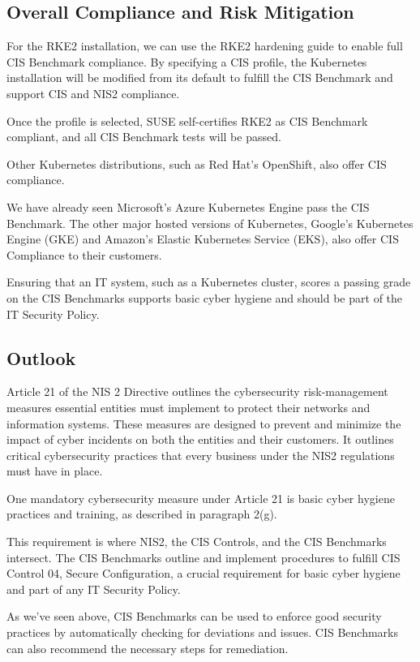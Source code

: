 \subsection{Overall Compliance and Risk Mitigation}

For the RKE2 installation, we can use the RKE2 hardening guide to enable full CIS Benchmark compliance. By specifying a CIS profile, the Kubernetes installation will be modified from its default to fulfill the CIS Benchmark and support CIS and NIS2 compliance.

Once the profile is selected, SUSE self-certifies RKE2 as CIS Benchmark compliant, and all CIS Benchmark tests will be passed.

Other Kubernetes distributions, such as Red Hat's OpenShift, also offer CIS compliance. 

We have already seen Microsoft's Azure Kubernetes Engine pass the CIS Benchmark. The other major hosted versions of Kubernetes, Google's Kubernetes Engine (GKE) and Amazon's Elastic Kubernetes Service (EKS), also offer CIS Compliance to their customers.

Ensuring that an IT system, such as a Kubernetes cluster, scores a passing grade on the CIS Benchmarks supports basic cyber hygiene and should be part of the IT Security Policy.

\subsection{Outlook}

Article 21 of the NIS 2 Directive outlines the cybersecurity risk-management measures essential entities must implement to protect their networks and information systems. These measures are designed to prevent and minimize the impact of cyber incidents on both the entities and their customers. It outlines critical cybersecurity practices that every business under the NIS2 regulations must have in place. 

One mandatory cybersecurity measure under Article 21 is basic cyber hygiene practices and training, as described in paragraph 2(g).

This requirement is where NIS2, the CIS Controls, and the CIS Benchmarks intersect. The CIS Benchmarks outline and implement procedures to fulfill CIS Control 04, Secure Configuration, a crucial requirement for basic cyber hygiene and part of any IT Security Policy.

As we've seen above, CIS Benchmarks can be used to enforce good security practices by automatically checking for deviations and issues. CIS Benchmarks can also recommend the necessary steps for remediation.

